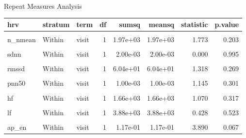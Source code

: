 \documentclass[
  ignorenonframetext,
  unknownkeysallowed]{beamer}
\begin{document}
\begin{frame}{Repeat Measures Analysis}
\protect\hypertarget{repeat-measures-analysis}{}

\begin{table}[H]
\centering\begingroup\fontsize{6}{8}\selectfont

\begin{tabular}{lllrrrrr}
\toprule
hrv & stratum & term & df & sumsq & meansq & statistic & p.value\\
\midrule
\cellcolor{gray!6}{n\_nmean} & \cellcolor{gray!6}{names} & \cellcolor{gray!6}{visit} & \cellcolor{gray!6}{1} & \cellcolor{gray!6}{1.89e+04} & \cellcolor{gray!6}{1.89e+04} & \cellcolor{gray!6}{2.235} & \cellcolor{gray!6}{0.232}\\
n\_nmean & Within & visit & 1 & 1.97e+03 & 1.97e+03 & 1.773 & 0.203\\
\cellcolor{gray!6}{sdnn} & \cellcolor{gray!6}{names} & \cellcolor{gray!6}{visit} & \cellcolor{gray!6}{1} & \cellcolor{gray!6}{1.46e+01} & \cellcolor{gray!6}{1.46e+01} & \cellcolor{gray!6}{0.479} & \cellcolor{gray!6}{0.539}\\
sdnn & Within & visit & 1 & 2.00e-03 & 2.00e-03 & 0.000 & 0.995\\
\cellcolor{gray!6}{rmssd} & \cellcolor{gray!6}{names} & \cellcolor{gray!6}{visit} & \cellcolor{gray!6}{1} & \cellcolor{gray!6}{1.16e+02} & \cellcolor{gray!6}{1.16e+02} & \cellcolor{gray!6}{5.378} & \cellcolor{gray!6}{0.103}\\
\addlinespace
rmssd & Within & visit & 1 & 6.04e+01 & 6.04e+01 & 1.318 & 0.269\\
\cellcolor{gray!6}{pnn50} & \cellcolor{gray!6}{names} & \cellcolor{gray!6}{visit} & \cellcolor{gray!6}{1} & \cellcolor{gray!6}{6.00e-03} & \cellcolor{gray!6}{6.00e-03} & \cellcolor{gray!6}{18.872} & \cellcolor{gray!6}{0.023}\\
pnn50 & Within & visit & 1 & 1.00e-03 & 1.00e-03 & 1.145 & 0.301\\
\cellcolor{gray!6}{hf} & \cellcolor{gray!6}{names} & \cellcolor{gray!6}{visit} & \cellcolor{gray!6}{1} & \cellcolor{gray!6}{2.04e+02} & \cellcolor{gray!6}{2.04e+02} & \cellcolor{gray!6}{0.079} & \cellcolor{gray!6}{0.797}\\
hf & Within & visit & 1 & 1.66e+03 & 1.66e+03 & 1.070 & 0.317\\
\addlinespace
\cellcolor{gray!6}{lf} & \cellcolor{gray!6}{names} & \cellcolor{gray!6}{visit} & \cellcolor{gray!6}{1} & \cellcolor{gray!6}{6.18e+03} & \cellcolor{gray!6}{6.18e+03} & \cellcolor{gray!6}{0.422} & \cellcolor{gray!6}{0.562}\\
lf & Within & visit & 1 & 3.88e+03 & 3.88e+03 & 0.428 & 0.523\\
\cellcolor{gray!6}{ap\_en} & \cellcolor{gray!6}{names} & \cellcolor{gray!6}{visit} & \cellcolor{gray!6}{1} & \cellcolor{gray!6}{2.00e-02} & \cellcolor{gray!6}{2.00e-02} & \cellcolor{gray!6}{0.804} & \cellcolor{gray!6}{0.436}\\
ap\_en & Within & visit & 1 & 1.17e-01 & 1.17e-01 & 3.890 & 0.067\\
\bottomrule
\end{tabular}
\endgroup{}
\end{table}

\end{frame}
\end{document}
